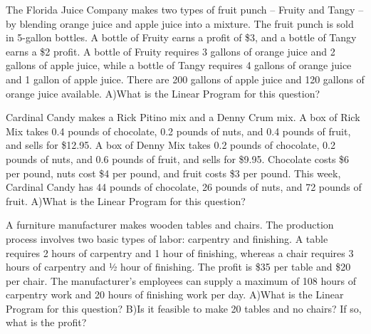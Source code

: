 \documentclass[11pt,epsfig]{article}
\begin{document}
\newpage

\begin{problem}{10}
The Florida Juice Company makes two types of fruit punch – Fruity and Tangy – by blending orange juice and apple juice into a mixture. The fruit punch is sold in 5-gallon bottles. A bottle of Fruity earns a profit of \$3, and a bottle of Tangy earns a \$2 profit. A bottle of Fruity requires 3 gallons of orange juice and 2 gallons of apple juice, while a bottle of Tangy requires 4 gallons of orange juice and 1 gallon of apple juice. There are 200 gallons of apple juice and 120 gallons of orange juice available.
\newline
A)What is the Linear Program for this question?
\vfill
\end{problem}


\begin{problem}{10}
Cardinal Candy makes a Rick Pitino mix and a Denny Crum mix. A box of Rick Mix takes 0.4 pounds of chocolate, 0.2 pounds of nuts, and 0.4 pounds of fruit, and sells for \$12.95. A box of Denny Mix takes 0.2 pounds of chocolate, 0.2 pounds of nuts, and 0.6 pounds of fruit, and sells for \$9.95. Chocolate costs \$6 per pound, nuts cost \$4 per pound, and fruit costs \$3 per pound. This week, Cardinal Candy has 44 pounds of chocolate, 26 pounds of nuts, and 72 pounds of fruit.
\newline
A)What is the Linear Program for this question?

\vfill
\end{problem}






\newpage

\begin{problem}{20}
A furniture manufacturer makes wooden tables and chairs. The production process involves two basic types of labor: carpentry and finishing. A table requires 2 hours of carpentry and 1 hour of finishing, whereas a chair requires 3 hours of carpentry and ½ hour of finishing. The profit is \$35 per table and \$20 per chair. The manufacturer's employees can supply a maximum of 108 hours of carpentry work and 20 hours of finishing work per day.
\newline
A)What is the Linear Program for this question?
\newline
B)Is it feasible to make 20 tables and no chairs? If so, what is the profit?
\vfill
\end{problem}
\end{document}
